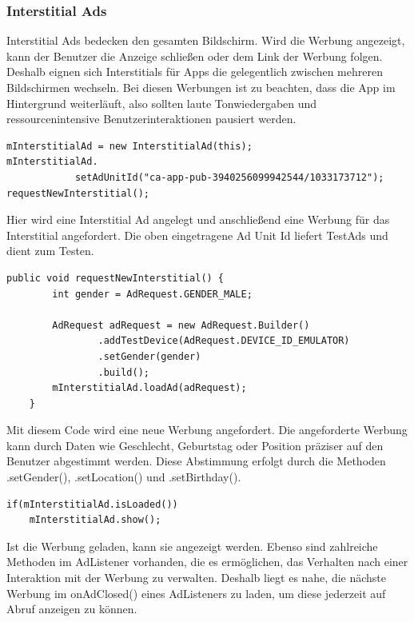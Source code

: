\documentclass[FIPLY_base.tex]{subfiles}
\begin{document}
\subsubsection{Interstitial Ads}
Interstitial Ads bedecken den gesamten Bildschirm. Wird die Werbung angezeigt, kann der Benutzer die Anzeige schließen oder dem Link der Werbung folgen.
Deshalb eignen sich Interstitials für Apps die gelegentlich zwischen mehreren Bildschirmen wechseln.
Bei diesen Werbungen ist zu beachten, dass die App im Hintergrund weiterläuft, also sollten laute Tonwiedergaben und ressourcenintensive Benutzerinteraktionen pausiert werden. 
\begin{lstlisting}[caption={Erstellen und Anfordern einer Interstitial Ad},label=DescriptiveLabel]
mInterstitialAd = new InterstitialAd(this);
mInterstitialAd.
       		setAdUnitId("ca-app-pub-3940256099942544/1033173712");
requestNewInterstitial();
\end{lstlisting}
Hier wird eine Interstitial Ad angelegt und anschließend eine Werbung für das Interstitial angefordert. 
Die oben eingetragene Ad Unit Id liefert TestAds und dient zum Testen.
\begin{lstlisting}[caption={Die requestNewInterstitial-Methode},label=DescriptiveLabel]
public void requestNewInterstitial() {
        int gender = AdRequest.GENDER_MALE;
        
        AdRequest adRequest = new AdRequest.Builder()
                .addTestDevice(AdRequest.DEVICE_ID_EMULATOR)
                .setGender(gender)
                .build();
        mInterstitialAd.loadAd(adRequest);
    }
\end{lstlisting}
Mit diesem Code wird eine neue Werbung angefordert. Die angeforderte Werbung kann durch Daten wie Geschlecht, Geburtstag oder Position präziser auf den Benutzer abgestimmt werden.
Diese Abstimmung erfolgt durch die Methoden .setGender(), .setLocation() und .setBirthday().	
\ \\
\begin{lstlisting}[caption={Das Anzeigen einer Interstitial Ad, sobald sie geladen ist},label=DescriptiveLabel]
if(mInterstitialAd.isLoaded()) 
    mInterstitialAd.show();
\end{lstlisting}
Ist die Werbung geladen, kann sie angezeigt werden.
Ebenso sind zahlreiche Methoden im AdListener vorhanden, die es ermöglichen, das Verhalten nach einer Interaktion mit der Werbung zu verwalten.
Deshalb liegt es nahe, die nächste Werbung im onAdClosed() eines AdListeners zu laden, um diese jederzeit auf Abruf anzeigen zu können.
\end{document}
